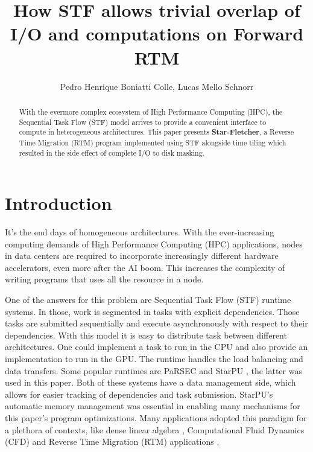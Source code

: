 \documentclass[12pt]{article}
\title{How STF allows trivial overlap of \\ I/O and computations on Forward RTM}
\author{Pedro Henrique Boniatti Colle, Lucas Mello Schnorr}
\newcommand{\starflet}{\textbf{Star-Fletcher}}
\begin{document}
 

\maketitle

\begin{abstract}
	With the evermore complex ecosystem of High Performance Computing (HPC), the Sequential Task Flow (STF) model arrives to provide a convenient interface to compute in heterogeneous architectures. This paper presents \starflet, a Reverse Time Migration (RTM) program implemented using STF alongside time tiling which resulted in the side effect of complete I/O to disk masking.
\end{abstract}

\section{Introduction}
\label{sec:introduction}
	It's the end days of homogeneous architectures. With the ever-increasing computing demands of High Performance Computing (HPC) applications, nodes in data centers are required to incorporate increasingly different hardware accelerators, even more after the AI boom. This increases the complexity of writing programs that uses all the resource in a node.

	One of the answers for this problem are Sequential Task Flow (STF) runtime systems. In those, work is segmented in tasks with explicit dependencies. Those tasks are submitted sequentially and execute asynchronously with respect to their dependencies. With this model it is easy to distribute task between different architectures. One could implement a task to run in the CPU and also provide an implementation to run in the GPU. The runtime handles the load balancing and data transfers. Some popular runtimes are PaRSEC \cite{bosilca_parsec_2013} and StarPU \cite{starpu-paper}, the latter was used in this paper. 
	Both of these systems have a data management side, which allows for easier tracking of dependencies and task submission. StarPU's automatic memory management was essential in enabling many mechanisms for this paper's program optimizations. Many applications adopted this paradigm for a plethora of contexts, like dense linear algebra \cite{abdulah_accelerating_2022}, Computational Fluid Dynamics (CFD) \cite{couteyen_carpaye_design_2018,leandro_nesi_task-based_2020} and Reverse Time Migration (RTM) applications \cite{boillot_task-based_2014, alonazi_asynchronous_2019}.
\end{document}
